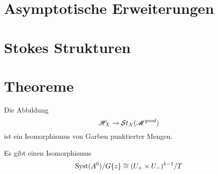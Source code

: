 \section{Asymptotische Erweiterungen} %
\section{Stokes Strukturen} %
\section{Theoreme} %
\begin{thm}
  Die Abbildung
  \[
    \mathscr{H}_X\to\mathcal{S}{}t_X(\mathscr{M}^{good})
  \]
  ist ein Isomorphismus von Garben punktierter Mengen.
\end{thm}

\begin{thm}
  Es gibt einen Isomorphismus
  \[
    \operatorname{Syst}(A^0)/G\{z\}\cong(U_+\times U_-)^{k-1}/T
  \]
\end{thm}
